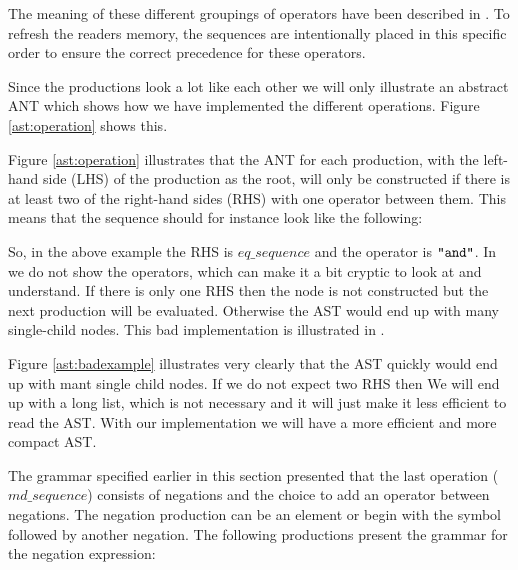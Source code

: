 The meaning of these different groupings of operators have been described in
. To refresh the readers memory, the sequences are
intentionally placed in this specific order to ensure the correct precedence for
these operators.

Since the productions look a lot like each other we will only illustrate an
abstract ANT which shows how we have implemented the different operations.
Figure \ref{ast:operation} shows this.



Figure \ref{ast:operation} illustrates that the ANT for each production, with
the left-hand side (LHS) of the production as the root, will only be constructed
if there is at least two of the right-hand sides (RHS) with one operator between
them. This means that the sequence should for instance look like the following:

\begin{ebnf}
\end{ebnf}

So, in the above example the RHS is $eq\_sequence$ and the operator is
$\texttt{"and"}$. In  we do not show the operators, which can
make it a bit cryptic to look at and understand. If there is only one RHS then
the node is not constructed but the next production will be evaluated. Otherwise
the AST would end up with many single-child nodes. This bad implementation is 
illustrated in .



Figure \ref{ast:badexample} illustrates very clearly that the AST quickly would
end up with mant single child nodes. If we do not expect two RHS then We will 
end up with a long list, which is not necessary and it will just make it less 
efficient to read the AST. With our implementation we will have a more efficient 
and more compact AST.

The grammar specified earlier in this section presented that the last operation
($md\_sequence$) consists of negations and the choice to add an operator between
negations. The negation production can be an element or begin with the \gter{-}
symbol followed by another negation.
The following productions present the grammar for the negation expression:

\begin{ebnf}
\end{ebnf}

